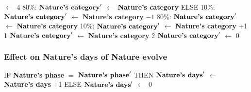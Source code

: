 \documentclass{article}%
\begin{document}
\begin{flushleft}
$\leftarrow$%
4%
\linebreak%
\hspace*{10em}%
80\%: %
$\mbox{\textbf{Nature's category}} '$%
$\leftarrow$%
\textbf{Nature's category}%
\linebreak%
\hspace*{8em}%
ELSE %
\linebreak%
\hspace*{10em}%
10\%: %
$\mbox{\textbf{Nature's category}} '$%
$\leftarrow$%
\textbf{Nature's category}%
${-}1$%
\linebreak%
\hspace*{10em}%
80\%: %
$\mbox{\textbf{Nature's category}} '$%
$\leftarrow$%
\textbf{Nature's category}%
\linebreak%
\hspace*{10em}%
10\%: %
$\mbox{\textbf{Nature's category}} '$%
$\leftarrow$%
\textbf{Nature's category}%
+1%
\linebreak%
\hspace*{2em}%
1 %
$\mbox{\textbf{Nature's category}} '$%
$\leftarrow$%
\textbf{Nature's category}%
\linebreak%
\hspace*{2em}%
2 %
$\mbox{\textbf{Nature's category}} '$%
$\leftarrow$%
0%
\end{flushleft}

%
\subsubsection{Effect on Nature's days of Nature evolve}%
\label{ssubsec:Effect on Nature's days of Nature evolve}%
\begin{flushleft}%
IF %
\textbf{Nature's phase}%
$=$%
$\mbox{\textbf{Nature's phase}} '$%
\linebreak%
\hspace*{2em}%
THEN %
$\mbox{\textbf{Nature's days}} '$%
$\leftarrow$%
\textbf{Nature's days}%
+1%
\linebreak%
\hspace*{2em}%
ELSE %
$\mbox{\textbf{Nature's days}} '$%
$\leftarrow$%
0%
\end{flushleft}

%
\end{document}
